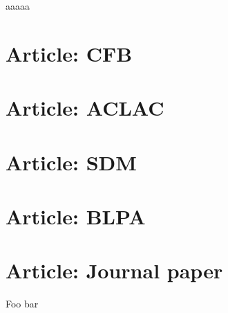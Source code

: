 \documentclass[doctoral,utf8,lot,loar,shortloft,index]{jydiss}
\begin{document}
\preface

 aaaaa

\acknowledgements



\mainmatter









\chapter{Article: CFB}


\chapter{Article: ACLAC}


\chapter{Article: SDM}


\chapter{Article: BLPA}


\chapter{Article: Journal paper}


\tailmatter
\finnishsummary
Foo bar


%

\backmatter


\printindex
\end{document}
